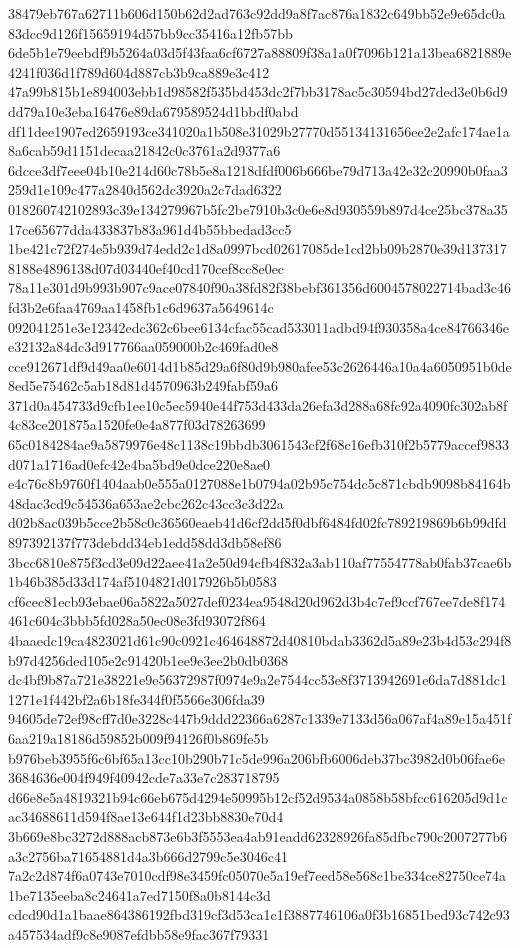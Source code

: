 \documentclass[11pt,a4paper]{article}
\begin{document}
{38479eb767a62711b606d150b62d2ad763c92dd9a8f7ac876a1832c649bb52e9e65dc0a83dcc9d126f15659194d57bb9cc35416a12fb57bb
6de5b1e79eebdf9b5264a03d5f43faa6cf6727a88809f38a1a0f7096b121a13bea6821889e4241f036d1f789d604d887cb3b9ca889e3c412
47a99b815b1e894003ebb1d98582f535bd453dc2f7bb3178ac5c30594bd27ded3e0b6d9dd79a10e3eba16476e89da679589524d1bbdf0abd
df11dee1907ed2659193ce341020a1b508e31029b27770d55134131656ee2e2afc174ae1a8a6cab59d1151decaa21842c0c3761a2d9377a6
6dcce3df7eee04b10e214d60c78b5e8a1218dfdf006b666be79d713a42e32c20990b0faa3259d1e109c477a2840d562dc3920a2c7dad6322
018260742102893c39e134279967b5fc2be7910b3c0e6e8d930559b897d4ce25bc378a3517ce65677dda433837b83a961d4b55bbedad3cc5
1be421c72f274e5b939d74edd2c1d8a0997bcd02617085de1cd2bb09b2870e39d1373178188e4896138d07d03440ef40cd170cef8cc8e0ec
78a11e301d9b993b907c9ace07840f90a38fd82f38bebf361356d6004578022714bad3c46fd3b2e6faa4769aa1458fb1c6d9637a5649614c
092041251e3e12342edc362c6bee6134cfac55cad533011adbd94f930358a4ce84766346ee32132a84dc3d917766aa059000b2c469fad0e8
cce912671df9d49aa0e6014d1b85d29a6f80d9b980afee53c2626446a10a4a6050951b0de8ed5e75462c5ab18d81d4570963b249fabf59a6
371d0a454733d9cfb1ee10c5ec5940e44f753d433da26efa3d288a68fc92a4090fc302ab8f4c83ce201875a1520fe0e4a877f03d78263699
65c0184284ae9a5879976e48c1138c19bbdb3061543cf2f68c16efb310f2b5779accef9833d071a1716ad0efc42e4ba5bd9e0dce220e8ae0
e4c76c8b9760f1404aab0e555a0127088e1b0794a02b95c754dc5c871cbdb9098b84164b48dac3cd9c54536a653ae2cbc262c43cc3c3d22a
d02b8ac039b5cce2b58c0c36560eaeb41d6cf2dd5f0dbf6484fd02fc789219869b6b99dfd897392137f773debdd34eb1edd58dd3db58ef86
3bcc6810e875f3cd3e09d22aee41a2e50d94cfb4f832a3ab110af77554778ab0fab37cae6b1b46b385d33d174af5104821d017926b5b0583
cf6cec81ecb93ebae06a5822a5027def0234ea9548d20d962d3b4c7ef9ccf767ee7de8f174461c604c3bbb5fd028a50ec08e3fd93072f864
4baaedc19ca4823021d61c90c0921c464648872d40810bdab3362d5a89e23b4d53c294f8b97d4256ded105e2c91420b1ee9e3ee2b0db0368
dc4bf9b87a721e38221e9e56372987f0974e9a2e7544cc53e8f3713942691e6da7d881dc11271e1f442bf2a6b18fe344f0f5566e306fda39
94605de72ef98cff7d0e3228c447b9ddd22366a6287c1339e7133d56a067af4a89e15a451f6aa219a18186d59852b009f94126f0b869fe5b
b976beb3955f6c6bf65a13cc10b290b71c5de996a206bfb6006deb37bc3982d0b06fae6e3684636e004f949f40942cde7a33e7c283718795
d66e8e5a4819321b94c66eb675d4294e50995b12cf52d9534a0858b58bfcc616205d9d1cac34688611d594f8ae13e644f1d23bb8830e70d4
3b669e8bc3272d888acb873e6b3f5553ea4ab91eadd62328926fa85dfbc790c2007277b6a3c2756ba71654881d4a3b666d2799c5e3046c41
7a2c2d874f6a0743e7010cdf98e3459fc05070e5a19ef7eed58e568c1be334ce82750ce74a1be7135eeba8c24641a7ed7150f8a0b8144c3d
cdcd90d1a1baae864386192fbd319cf3d53ca1c1f3887746106a0f3b16851bed93c742c93a457534adf9c8e9087efdbb58e9fac367f79331
}
\end{document}
